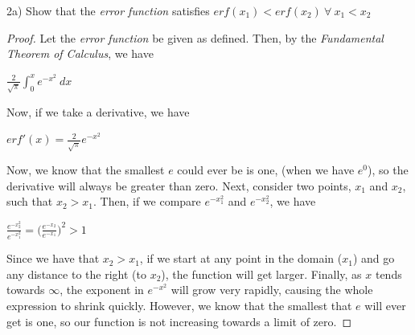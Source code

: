 \documentclass[12pt, executivepaper]{article}
\begin{document}
\begin{flushleft}

2a) Show that the \textit{error function} satisfies $erf(x_{1}) < erf(x_{2}) {~} \forall {~} x_{1} < x_{2}$

\begin{proof}

Let the \textit{error function} be given as defined. Then, by the \textit{Fundamental Theorem of Calculus}, we have

\begin{center}

$\frac{2}{\sqrt{\pi}} \int_{0}^{x} e^{-x^{2}} \ dx$

\end{center}

Now, if we take a derivative, we have

\begin{center}

$erf'(x)=\frac{2}{\sqrt{\pi}} e^{-x^{2}}$

\end{center}

Now, we know that the smallest $e$ could ever be is one, (when we have $e^0$), so the derivative will always be greater than zero. Next, consider two points, $x_{1}$ and $x_{2}$, such that $x_{2} > x_{1}$. Then, if we compare $e^{-x_{1}^{2}}$ and $e^{-x_{2}^{2}}$, we have

\begin{center}

$\frac{e^{-x_{2}^{2}}}{e^{-x_{1}^{2}}}=\bigg(\frac{e^{-x_{2}}}{e^{-x_{1}}}\bigg)^2 > 1$

\end{center}

\pagebreak

\vspace*{-40mm}

Since we have that $x_{2} > x_{1}$, if we start at any point in the domain ($x_{1}$) and go any distance to the right (to $x_{2}$), the function will get larger. Finally, as $x$ tends towards $\infty$, the exponent in $e^{-x^{2}}$ will grow very rapidly, causing the whole expression to shrink quickly. However, we know that the smallest that $e$ will ever get is one, so our function is not increasing towards a limit of zero.

\end{proof}

\end{flushleft}
\end{document}
